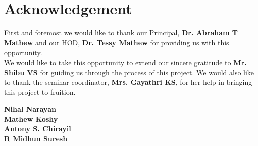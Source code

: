 \chapter*{\centering Acknowledgement}

\begin{flushleft}
	First and foremost we would like to thank our Principal, \textbf{Dr. Abraham T Mathew} and our HOD, \textbf{Dr. Tessy Mathew} for providing us with 
	this opportunity.\\
	 We would like to take this opportunity to extend our sincere gratitude to \textbf{Mr. Shibu VS} for guiding us through the process of this project.
	 We would also like to thank the seminar coordinator, \textbf{Mrs. Gayathri KS}, for her help in bringing this project to fruition.
\end{flushleft}

\vspace{4.0 cm}

\begin{flushright}
	\textbf{Nihal Narayan} \\
	\textbf{Mathew Koshy} \\
	\textbf{Antony S. Chirayil} \\
	\textbf{R Midhun Suresh} \\
\end{flushright}














